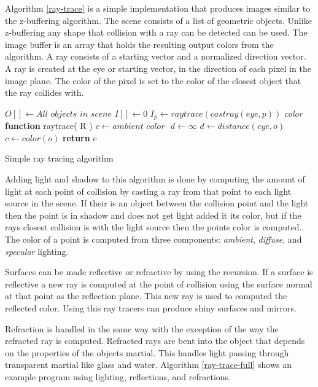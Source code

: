 \documentclass[11pt,a4paper,oneside]{article}
\begin{document}
Algorithm \ref{ray-trace} is a simple implementation that produces images similar to the z-buffering algorithm.  The scene consists of a list of geometric objects.  Unlike z-buffering any shape that collision with a ray can be detected can be used.  The image buffer is an array that holds the resulting output colors from the algorithm.  A ray consists of a starting vector and a normalized direction vector.  A ray is created at the eye or starting vector, in the direction of each pixel in the image plane.  The color of the pixel is set to the color of the closest object that the ray collides with.  

\begin{algorithm}[H]
\begin{algorithmic}[1]
\STATE $O[ ] \gets \textit{All objects in scene}$ 
\STATE $I[] \gets 0$ 
\STATE
{}
	\STATE $I_{p} \gets raytrace( castray( eye, p ))$
\ENDFOR
\STATE 
\STATE \textit{color} \textbf{function} raytrace(  R )
	\STATE $c  \gets \textit{ambient color } $
	\STATE $d \gets \infty $
				\STATE $d \gets distance( \textit{eye}, o )$
				\STATE $c \gets color( o )$
			\ENDIF
		\ENDIF
	\ENDFOR
	\STATE \textbf{return} c

\end{algorithmic}
\caption{Simple ray tracing algorithm}
\label{ray-trace}
\end{algorithm}

Adding light and shadow to this algorithm is done by computing the amount of light at each point of collision by casting a ray from that point to each light source in the scene.  If their is an object between the collision point and the light then the point is in shadow and does not get light added it its color, but if the rays closest collision is with the light source then the points color is computed..  The color of a point is computed from three components: \textit{ambient}, \textit{diffuse}, and \textit{specular} lighting\cite{kalinini:2008}.

Surfaces can be made reflective or refractive by using the recursion.  If a surface is reflective a new ray is computed at the point of collision using the surface normal at that point as the reflection plane.  This new ray is used to computed the reflected color.  Using this ray tracers can produce shiny surfaces and mirrors.  

Refraction is handled in the same way with the exception of the way the refracted ray is computed.  Refracted rays are bent into the object that depends on the properties of the objects martial.  This handles light passing through transparent martial like glass and water. Algorithm \ref{ray-trace-full} shows an example program using lighting, reflections, and refractions.
  
\end{document}
